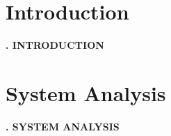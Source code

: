 \documentclass[12pt, a4paper, oneside]{report}
\let\oldchapter\chapter
\renewcommand{\chapter}[1]{%
  \oldchapter{#1}%
  \begin{center}\Large\textbf{\thechapter. \MakeUppercase{#1}}\end{center}%
  \vspace{1cm}%
}
\begin{document}
\tableofcontents

\chapter{Introduction}
\lipsum[1]

\chapter{System Analysis}
\lipsum[2]
\end{document}
